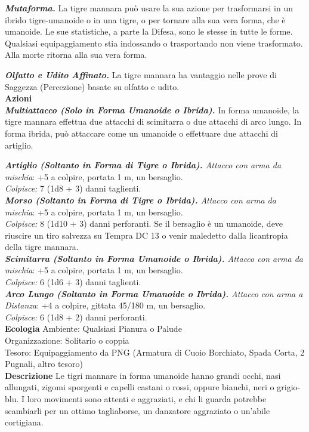 \begin{multicols}{2}
\emph{\textbf{Mutaforma.}} La tigre mannara può usare la sua azione per trasformarsi in un ibrido tigre-umanoide o in una tigre, o per tornare alla sua vera forma, che è umanoide. Le sue statistiche, a parte la Difesa, sono le stesse in tutte le forme. Qualsiasi equipaggiamento stia indossando o trasportando non viene trasformato. Alla morte ritorna alla sua vera forma.

\emph{\textbf{Olfatto e Udito Affinato.}} La tigre mannara ha vantaggio nelle prove di Saggezza (Percezione) basate su olfatto e udito.\\

\smallskip\textbf{Azioni}\\

\emph{\textbf{Multiattacco (Solo in Forma Umanoide o Ibrida).}} In forma umanoide, la tigre mannara effettua due attacchi di scimitarra o due attacchi di arco lungo. In forma ibrida, può attaccare come un umanoide o effettuare due attacchi di artiglio.

\emph{\textbf{Artiglio (Soltanto in Forma di Tigre o Ibrida).} Attacco con arma da mischia}: +5 a colpire, portata 1 m, un bersaglio.\\
\emph{Colpisce:} 7 (1d8 + 3) danni taglienti.\\

\emph{\textbf{Morso (Soltanto in Forma di Tigre o Ibrida).} Attacco con arma da mischia}: +5 a colpire, portata 1 m, un bersaglio.\\
\emph{Colpisce:} 8 (1d10 + 3) danni perforanti. Se il bersaglio è un umanoide, deve riuscire un tiro salvezza su Tempra DC 13 o venir maledetto dalla licantropia della tigre mannara.\\

\emph{\textbf{Scimitarra (Soltanto in Forma Umanoide o Ibrida).} Attacco con arma da mischia}: +5 a colpire, portata 1 m, un bersaglio.\\
\emph{Colpisce:} 6 (1d6 + 3) danni taglienti.\\

\emph{\textbf{Arco Lungo (Soltanto in Forma Umanoide o Ibrida).} Attacco con arma a Distanza}: +4 a colpire, gittata 45/180 m, un bersaglio.\\

\emph{Colpisce:} 6 (1d8 + 2) danni perforanti.\\
\textbf{Ecologia}
Ambiente: Qualsiasi Pianura o Palude\\
Organizzazione: Solitario o coppia\\
Tesoro: Equipaggiamento da PNG (Armatura di Cuoio Borchiato, Spada Corta, 2 Pugnali, altro tesoro)\\
\textbf{Descrizione}
Le tigri mannare in forma umanoide hanno grandi occhi, nasi allungati, zigomi sporgenti e capelli castani o rossi, oppure bianchi, neri o grigio-blu. I loro movimenti sono attenti e aggraziati, e chi li guarda potrebbe scambiarli per un ottimo tagliaborse, un danzatore aggraziato o un’abile cortigiana.\\


\end{multicols}
